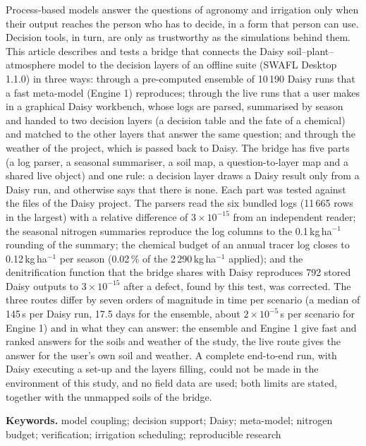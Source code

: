 \begin{titlepage}
{\noindent Process-based models answer the questions of agronomy and irrigation only when their output reaches the person who has to decide, in a form that person can use. Decision tools, in turn, are only as trustworthy as the simulations behind them. This article describes and tests a bridge that connects the Daisy soil--plant--atmosphere model to the decision layers of an offline suite (SWAFL Desktop 1.1.0) in three ways: through a pre-computed ensemble of 10\,190 Daisy runs that a fast meta-model (Engine 1) reproduces; through the live runs that a user makes in a graphical Daisy workbench, whose logs are parsed, summarised by season and handed to two decision layers (a decision table and the fate of a chemical) and matched to the other layers that answer the same question; and through the weather of the project, which is passed back to Daisy. The bridge has five parts (a log parser, a seasonal summariser, a soil map, a question-to-layer map and a shared live object) and one rule: a decision layer draws a Daisy result only from a Daisy run, and otherwise says that there is none. Each part was tested against the files of the Daisy project. The parsers read the six bundled logs (11\,665 rows in the largest) with a relative difference of $3\times10^{-15}$ from an independent reader; the seasonal nitrogen summaries reproduce the log columns to the 0.1\,kg\,ha$^{-1}$ rounding of the summary; the chemical budget of an annual tracer log closes to 0.12\,kg\,ha$^{-1}$ per season (0.02\,\% of the 2\,290\,kg\,ha$^{-1}$ applied); and the denitrification function that the bridge shares with Daisy reproduces 792 stored Daisy outputs to $3\times10^{-15}$ after a defect, found by this test, was corrected. The three routes differ by seven orders of magnitude in time per scenario (a median of 145\,s per Daisy run, 17.5 days for the ensemble, about $2\times10^{-5}$\,s per scenario for Engine 1) and in what they can answer: the ensemble and Engine 1 give fast and ranked answers for the soils and weather of the study, the live route gives the answer for the user's own soil and weather. A complete end-to-end run, with Daisy executing a set-up and the layers filling, could not be made in the environment of this study, and no field data are used; both limits are stated, together with the unmapped soils of the bridge.

\medskip\noindent \textbf{Keywords.} model coupling; decision support; Daisy; meta-model; nitrogen budget; verification; irrigation scheduling; reproducible research\par}
\end{titlepage}

